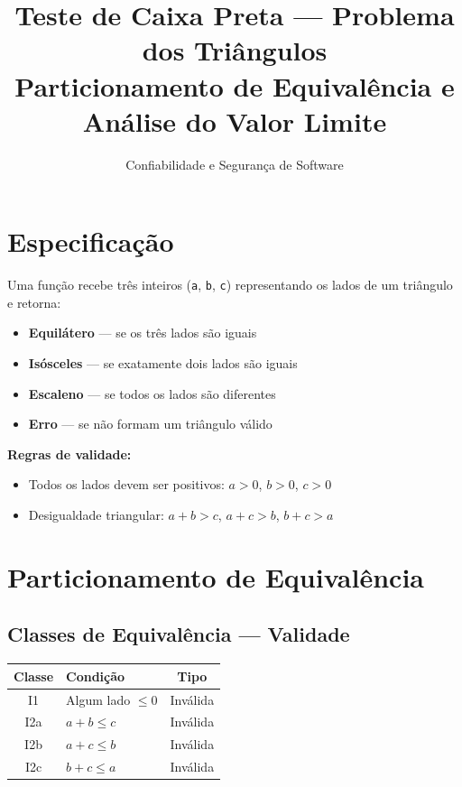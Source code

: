 \documentclass[12pt,a4paper]{article}
\title{\textbf{Teste de Caixa Preta --- Problema dos Triângulos}\\[0.3em]
\large Particionamento de Equivalência e Análise do Valor Limite}
\author{Confiabilidade e Segurança de Software}
\date{}
\begin{document}
\maketitle

\section{Especificação}

Uma função recebe três inteiros (\texttt{a}, \texttt{b}, \texttt{c}) representando os lados de um triângulo e retorna:

\begin{itemize}[nosep]
  \item \textbf{Equilátero} --- se os três lados são iguais
  \item \textbf{Isósceles} --- se exatamente dois lados são iguais
  \item \textbf{Escaleno} --- se todos os lados são diferentes
  \item \textbf{Erro} --- se não formam um triângulo válido
\end{itemize}

\noindent\textbf{Regras de validade:}
\begin{itemize}[nosep]
  \item Todos os lados devem ser positivos: $a > 0$, $b > 0$, $c > 0$
  \item Desigualdade triangular: $a + b > c$,\; $a + c > b$,\; $b + c > a$
\end{itemize}

\section{Particionamento de Equivalência}

\subsection{Classes de Equivalência --- Validade}

\begin{center}
\begin{tabular}{clc}
\toprule
\textbf{Classe} & \textbf{Condição} & \textbf{Tipo} \\
\midrule
I1 & Algum lado $\leq 0$ & Inválida \\
I2a & $a + b \leq c$ & Inválida \\
I2b & $a + c \leq b$ & Inválida \\
I2c & $b + c \leq a$ & Inválida \\
\bottomrule
\end{tabular}
\end{center}
\end{document}
